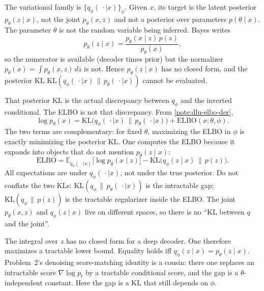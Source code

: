 \begin{remark}
\label{rem:dlu-elbo-logic}
The variational family is \(\{q_\phi(\,\cdot\mid x)\}_\phi\). Given \(x\), its target is the latent posterior \(p_\theta(z\mid x)\), not the joint \(p_\theta(x,z)\) and not a posterior over parameters \(p(\theta\mid x)\). The parameter \(\theta\) is not the random variable being inferred. Bayes writes
\[
p_\theta(z\mid x)
=
\frac{p_\theta(x\mid z)\,p(z)}{p_\theta(x)},
\]
so the numerator is available (decoder times prior) but the normalizer \(p_\theta(x)=\int p_\theta(x,z)\,dz\) is not. Hence \(p_\theta(z\mid x)\) has no closed form, and the posterior KL \(\mathrm{KL}(q_\phi(\,\cdot\mid x)\,\|\,p_\theta(\,\cdot\mid x))\) cannot be evaluated.

That posterior KL is the actual discrepancy between \(q_\phi\) and the inverted conditional. The ELBO is not that discrepancy. From \cref{note:dlu-elbo-der},
\[
\log p_\theta(x)
=
\mathrm{KL}\bigl(q_\phi(\,\cdot\mid x)\,\|\,p_\theta(\,\cdot\mid x)\bigr)
+
\mathrm{ELBO}(x;\theta,\phi).
\]
The two terms are complementary: for fixed \(\theta\), maximizing the ELBO in \(\phi\) is exactly minimizing the posterior KL. One computes the ELBO because it expands into objects that do not mention \(p_\theta(z\mid x)\):
\[
\mathrm{ELBO}
=
\mathbb{E}_{q_\phi(\,\cdot\mid x)}\bigl[\log p_\theta(x\mid z)\bigr]
-
\mathrm{KL}\bigl(q_\phi(z\mid x)\,\|\,p(z)\bigr).
\]
All expectations are under \(q_\phi(\,\cdot\mid x)\), not under the true posterior. Do not conflate the two KLs: \(\mathrm{KL}(q_\phi\,\|\,p_\theta(\,\cdot\mid x))\) is the intractable gap; \(\mathrm{KL}(q_\phi\,\|\,p(z))\) is the tractable regularizer inside the ELBO. The joint \(p_\theta(x,z)\) and \(q_\phi(z\mid x)\) live on different spaces, so there is no ``KL between \(q\) and the joint''.
\end{remark}

\begin{remark}
\label{rem:dlu-why-vae}
The integral over \(z\) has no closed form for a deep decoder. One therefore maximizes a tractable lower bound. Equality holds iff \(q_\phi(z\mid x)=p_\theta(z\mid x)\). Problem~2's denoising score-matching identity is a cousin: there one replaces an intractable score \(\nabla\log p_t\) by a tractable conditional score, and the gap is a \(\theta\)-independent constant. Here the gap is a KL that still depends on \(\phi\).
\end{remark}

